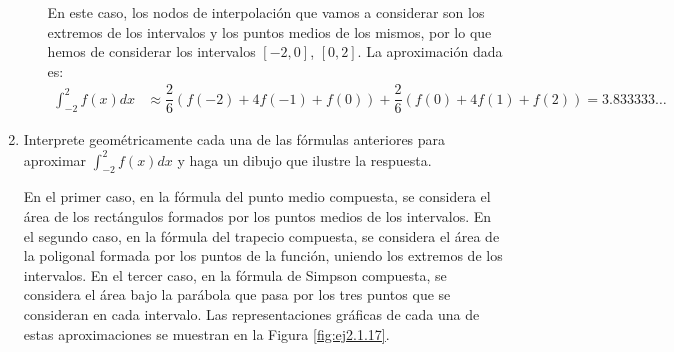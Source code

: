 \begin{ejercicio}
\begin{enumerate}
\begin{enumerate}
            En este caso, los nodos de interpolación que vamos a considerar son los extremos de los intervalos y los puntos medios de los mismos, por lo que hemos de considerar los intervalos $[-2, 0]$, $[0, 2]$. La aproximación dada es:
            \begin{align*}
                \int_{-2}^{2} f(x) dx &\approx \dfrac{2}{6}\left(f(-2) + 4f(-1) + f(0)\right) + \dfrac{2}{6}\left(f(0) + 4f(1) + f(2)\right) = 3.833333\ldots
            \end{align*}
        \end{enumerate}
        \item Interprete geométricamente cada una de las fórmulas anteriores para aproximar $\int_{-2}^{2} f(x) dx$ y haga un dibujo que ilustre la respuesta.
        
        En el primer caso, en la fórmula del punto medio compuesta, se considera el área de los rectángulos formados por los puntos medios de los intervalos. En el segundo caso, en la fórmula del trapecio compuesta, se considera el área de la poligonal formada por los puntos de la función, uniendo los extremos de los intervalos. En el tercer caso, en la fórmula de Simpson compuesta, se considera el área bajo la parábola que pasa por los tres puntos que se consideran en cada intervalo. Las representaciones gráficas de cada una de estas aproximaciones se muestran en la Figura \ref{fig:ej2.1.17}.
        \begin{figure}
            \centering
            \begin{subfigure}[b]{0.3\textwidth}
                \centering
\end{subfigure}
\end{figure}
\end{enumerate}
\end{ejercicio}
